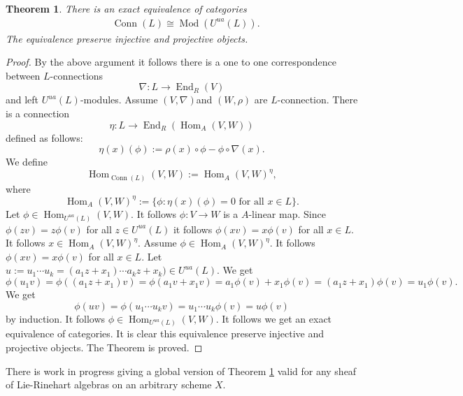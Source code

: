 \documentclass{amsart}
\theoremstyle{plain}
\newtheorem{theorem}{Theorem}[section]
\theoremstyle{definition}
\theoremstyle{remark}
\numberwithin{equation}{theorem}
\begin{document}
\begin{theorem} \label{equiv} There is an exact equivalence of categories
\begin{align}
&\label{morita}  {\operatorname{Conn}}(L)\cong {\operatorname{Mod}}({U^{ua}}(L)) .
\end{align}
The equivalence preserve injective and projective objects.
\end{theorem}
\begin{proof} By the above argument it follows there is a one to one correspondence between $L$-connections
\[ \nabla:L\rightarrow {\operatorname{End} }_{R}(V)\]
and left ${U^{ua}}(L)$-modules. Assume $(V,\nabla)$and $(W,\rho)$ are $L$-connection. There is a connection
\[ \eta:L\rightarrow {\operatorname{End} }_{R}({\operatorname{Hom} }_{A}(V,W)) \]
defined as follows:
\[ \eta(x)(\phi):=\rho(x)\circ \phi -\phi\circ \nabla(x).\]
We define
\[ {\operatorname{Hom} }_{{\operatorname{Conn}}(L)}(V,W):={\operatorname{Hom} }_{A}(V,W)^{\eta}, \]
where 
\[ {\operatorname{Hom} }_{A}(V,W)^{\eta}:=\{ \phi:\eta(x)(\phi)=0\text{ for all }x\in L\}.\]
Let $\phi\in {\operatorname{Hom} }_{{U^{ua}}(L)}(V,W)$. It follows $\phi:V\rightarrow W$ is a ${A}$-linear map.
Since $\phi(zv)=z\phi(v)$ for all $z\in {U^{ua}}(L)$ it follows $\phi(xv)=x\phi(v)$ for all $x\in L$. It follows
$x\in {\operatorname{Hom} }_{A}(V,W)^{\eta}$. Assume $\phi\in {\operatorname{Hom} }_{A}(V,W)^{\eta}$. It follows $\phi(xv)=x\phi(v)$ for all $x\in L$.
Let $u:=u_1\cdots u_k=(a_1z+x_1)\cdots a_kz+x_k)\in {U^{ua}}(L)$. We get
\[ \phi(u_1v)=\phi((a_1z+x_1)v)=\phi(a_1v+x_1v)=a_1\phi(v)+x_1\phi(v)=(a_1z+x_1)\phi(v)=u_1\phi(v).\]
We get
\[ \phi(uv)=\phi(u_1\cdots u_kv)=u_1\cdots u_k\phi(v)=u\phi(v) \]
by induction. It follows $\phi\in {\operatorname{Hom} }_{{U^{ua}}(L)}(V,W)$. It follows we get an exact equivalence
of categories. It is clear this equivalence preserve injective and projective objects. The Theorem is proved.
\end{proof}

There is work in progress giving a global version of Theorem \ref{equiv} valid for any sheaf of Lie-Rinehart algebras
on an arbitrary scheme $X$.
\end{document}
